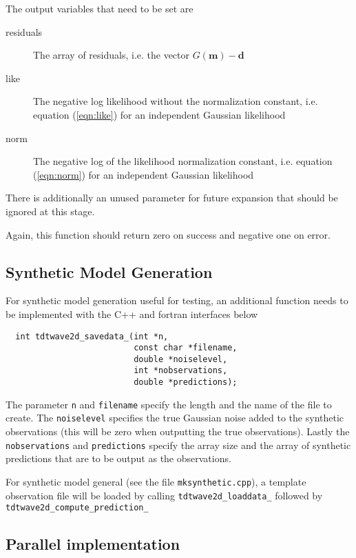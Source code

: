 \documentclass[a4paper,12pt]{article}
\begin{document}
The output variables that need to be set are

\begin{description}
\item[residuals] The array of residuals, i.e. the vector $G(\mathbf{m}) - \mathbf{d}$
\item[like] The negative log likelihood without the normalization constant, i.e. equation (\ref{eqn:like})
  for an independent Gaussian likelihood
\item[norm] The negative log of the likelihood normalization constant, i.e. equation (\ref{eqn:norm})
  for an independent Gaussian likelihood
\end{description}

There is additionally an unused parameter for future expansion that should be ignored
at this stage.

Again, this function should return zero on success and negative one on error.

\subsection{Synthetic Model Generation}

For synthetic model generation useful for testing, an additional function needs to be
implemented with the C++ and fortran interfaces below

\begin{verbatim}
  int tdtwave2d_savedata_(int *n,
                          const char *filename,
                          double *noiselevel,
                          int *nobservations,
                          double *predictions);
\end{verbatim}

The parameter {\tt n} and {\tt filename} specify the length and the name
of the file to create. The {\tt noiselevel} specifies the true Gaussian
noise added to the synthetic observations (this will be zero when
outputting the true observations). Lastly the {\tt nobservations} and
{\tt predictions} specify the array size and the array of synthetic
predictions that are to be output as the observations.

For synthetic model general (see the file {\tt mksynthetic.cpp}), a
template observation file will be loaded by calling {\tt tdtwave2d\_loaddata\_}
followed by {\tt tdtwave2d\_compute\_prediction\_} 

\subsection{Parallel implementation}
\end{document}
